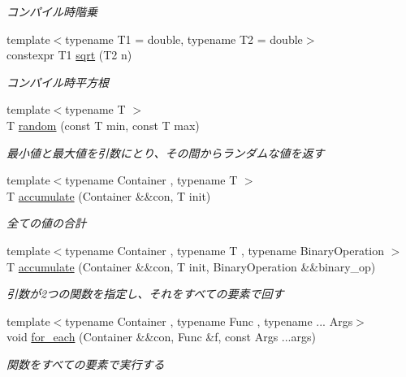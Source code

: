 \begin{DoxyCompactItemize}
\begin{DoxyCompactList}\small\item\em コンパイル時階乗 \end{DoxyCompactList}\item 
{\footnotesize template$<$typename T1  = double, typename T2  = double$>$ }\\constexpr T1 \mbox{\hyperlink{namespacesaki_a1dd39b17c9f89c99717d452d9318eb83}{sqrt}} (T2 n)
\begin{DoxyCompactList}\small\item\em コンパイル時平方根 \end{DoxyCompactList}\item 
{\footnotesize template$<$typename T $>$ }\\T \mbox{\hyperlink{namespacesaki_a5c175260f48a0b3410568b9b555ac5b8}{random}} (const T min, const T max)
\begin{DoxyCompactList}\small\item\em 最小値と最大値を引数にとり、その間からランダムな値を返す \end{DoxyCompactList}\item 
{\footnotesize template$<$typename Container , typename T $>$ }\\T \mbox{\hyperlink{namespacesaki_a8cb1089e57771254bd2d09f6b3d73472}{accumulate}} (Container \&\&con, T init)
\begin{DoxyCompactList}\small\item\em 全ての値の合計 \end{DoxyCompactList}\item 
{\footnotesize template$<$typename Container , typename T , typename Binary\+Operation $>$ }\\T \mbox{\hyperlink{namespacesaki_a6ff190807de56e50ef4416e313b591f3}{accumulate}} (Container \&\&con, T init, Binary\+Operation \&\&binary\+\_\+op)
\begin{DoxyCompactList}\small\item\em 引数が2つの関数を指定し、それをすべての要素で回す \end{DoxyCompactList}\item 
{\footnotesize template$<$typename Container , typename Func , typename ... Args$>$ }\\void \mbox{\hyperlink{namespacesaki_a3d3a1b6e961ca64485c02c925ca51399}{for\+\_\+each}} (Container \&\&con, Func \&f, const Args ...args)
\begin{DoxyCompactList}\small\item\em 関数をすべての要素で実行する \end{DoxyCompactList}\item 

\end{DoxyCompactItemize}
